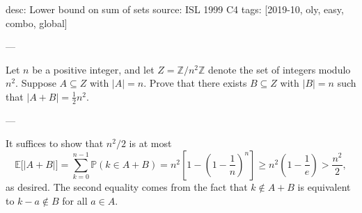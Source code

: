 desc: Lower bound on sum of sets
source: ISL 1999 C4
tags: [2019-10, oly, easy, combo, global]

---

Let $n$ be a positive integer, and let $Z=\mathbb Z/n^2\mathbb Z$ denote the set of integers modulo $n^2$. Suppose $A\subseteq Z$ with $|A|=n$. Prove that there exists $B\subseteq Z$ with $|B|=n$ such that $|A+B|=\frac12n^2$.

---

It suffices to show that $n^2/2$ is at most \[\mathbb E\big[|A+B|\big]=\sum_{k=0}^{n-1}\mathbb P(k\in A+B)=n^2\left[1-\left(1-\frac1n\right)^n\right]\ge n^2\left(1-\frac1e\right)>\frac{n^2}2,\]
as desired. The second equality comes from the fact that $k\notin A+B$ is equivalent to $k-a\notin B$ for all $a\in A$.
